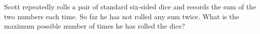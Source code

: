 Scott repeatedly rolls a pair of standard six-sided dice and records the sum of the two numbers each time. So far he has not rolled any sum twice. What is the maximum possible number of times he has rolled the dice?

